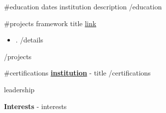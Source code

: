 \documentclass[9pt]{developercv} %
\begin{document}
\begin{entrylist}
    {{#education}}
    \entry
		{{dates}}
		{{institution}}
		{}
		{{description}}
    {{/education}}
\end{entrylist}
\vspace{-10 pt}
\begin{entrylist}
    {{#experience}}
	\entry
        {{dates}}
		{{title}}
		{{company}}
		{\vspace{-10pt}
        \begin{itemize}[noitemsep,topsep=0pt,parsep=0pt,partopsep=0pt, leftmargin=-1pt]
            {{#tasks}}
            \item {{.}}
            {{/tasks}}
        \end{itemize} 
        {{technologies}}
    {{/experience}}
\end{entrylist}
\vspace{-10 pt}
\begin{entrylist}
    {{#projects}}
    \entry
        {{framework}}
        {{title}}
        {\href{{link}}{link}}
        {\begin{itemize}[noitemsep,topsep=0pt,parsep=0pt,partopsep=0pt, leftmargin=-1pt]
            {{#details}}
            \item {{.}}
            {{/details}}
        \end{itemize}}
    {{/projects}}
\end{entrylist}


\vspace{-10 pt}
    {{#certifications}}
    \hspace{26mm} \textbf{\href{{link}}{institution}} - {{title}}
    {{/certifications}}


    \hspace{26mm} {{leadership}}

    \vspace{-6pt}

    \hspace{26mm} \textbf{Interests} - {{interests}}

\end{document}

